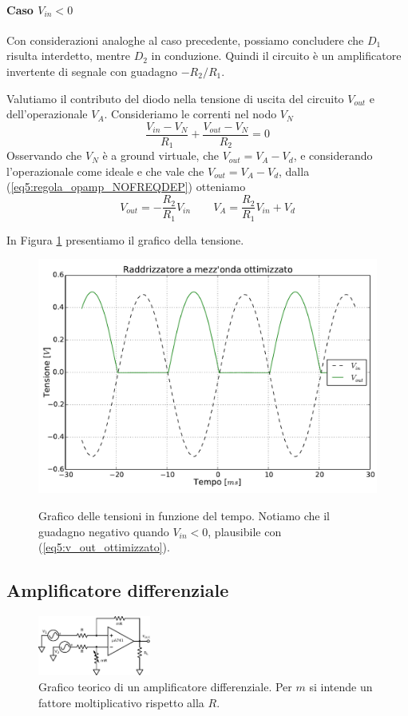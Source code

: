 \paragraph*{Caso $V_{in}<0$}

Con considerazioni analoghe al caso precedente, possiamo concludere che $D_1$ risulta interdetto, mentre $D_2$ in conduzione. Quindi il circuito è un amplificatore invertente di segnale con guadagno $-R_2/R_1$.

Valutiamo il contributo del diodo nella tensione di uscita del circuito $V_{out}$ e dell'operazionale $V_{A}$. Consideriamo le correnti nel nodo $V_N$
$$\frac{V_{in}-V_N}{R_1} + \frac{V_{out}-V_N}{R_2} = 0$$
Osservando che $V_N$ è a ground virtuale, che $V_{out}=V_{A}-V_d$, e considerando l'operazionale come ideale e che vale che $V_{out}=V_{A}-V_d$, dalla (\ref{eq5:regola_opamp_NOFREQDEP}) otteniamo
\begin{equation}
V_{out}=-\frac{R_2}{R_1}V_{in} \qquad V_A = \frac{R_2}{R_1} V_{in} + V_d
\label{eq5:v_out_ottimizzato}
\end{equation}

In Figura \ref{gr5:secondo_raddrizzatore} presentiamo il grafico della tensione.

\begin{figure}[ht]
 \centering
   {\includegraphics[width=.7\textwidth]{../E05/latex/radd_ott.pdf}}
 \caption{Grafico delle tensioni in funzione del tempo. Notiamo che il guadagno negativo quando $V_{in}<0$, plausibile con (\ref{eq5:v_out_ottimizzato}).}
 \label{gr5:secondo_raddrizzatore}
\end{figure}

\break
\subsection{Amplificatore differenziale}

\begin{figure}
  \begin{center}
    \includegraphics[width=0.33\textwidth]{../E05/latex/c_teo_diff_amp.pdf}
  \end{center}
  \caption{Grafico teorico di un amplificatore differenziale. Per $m$ si intende un fattore moltiplicativo rispetto alla $R$.}
  \label{cir5:diff_amp_teo}
\end{figure}

